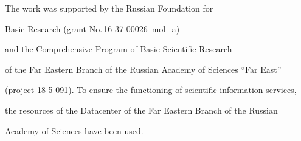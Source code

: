 









\vspace*{-16pt}





\Ack





\vspace*{-8pt}





\noindent


The work was supported by the Russian Foundation for


Basic Research (grant No.\,16-37-00026~mol\_a) 


and the Comprehensive Program of Basic Scientific Research 


of the Far Eastern Branch of the Russian Academy of Sciences ``Far East'' 


(project 18-5-091). To ensure the functioning of scientific information services, 


the resources of the Datacenter of the Far Eastern Branch of the Russian 


Academy of Sciences have been used.





 


\vspace*{-7pt}





\renewcommand{\bibname}{\protect\rmfamily References}







